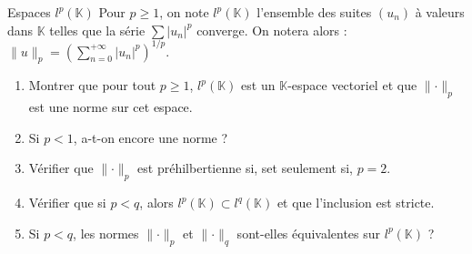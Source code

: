 \documentclass[french,a4paper]{article}
\newcommand{\K}{\mathbb{K}}
\theoremstyle{plain}
\theoremstyle{definition}
\theoremstyle{remark}
\begin{document}
\begin{ex}{Espaces $l^p(\K)$}
	Pour $p\geqslant 1$, on note $l^p(\K)$ l'ensemble des suites $(u_n)$ à valeurs dans $\K$ telles que la série $\sum \lvert u_n\rvert^p$ converge. On notera alors : $\lVert u\rVert_p=\displaystyle\left(\sum_{n=0}^{+\infty}\lvert u_n\rvert^p\right)^{1/p}$.
	\begin{enumerate}
		\item Montrer que pour tout $p\geqslant 1$, $l^p(\K)$ est un $\K$-espace vectoriel et que $\lVert\cdot\rVert_p$ est une norme sur cet espace.
		\item Si $p<1$, a-t-on encore une norme ?
		\item Vérifier que $\lVert\cdot\rVert_p$ est préhilbertienne si, set seulement si, $p=2$.
		\item Vérifier que si $p<q$, alors $l^p(\K)\subset l^q(\K)$ et que l'inclusion est stricte.
		\item Si $p<q$, les normes $\lVert \cdot\rVert_p$ et $\lVert\cdot\rVert_q$ sont-elles équivalentes sur $l^p(\K)$ ?
	\end{enumerate}
\end{ex}
\end{document}

